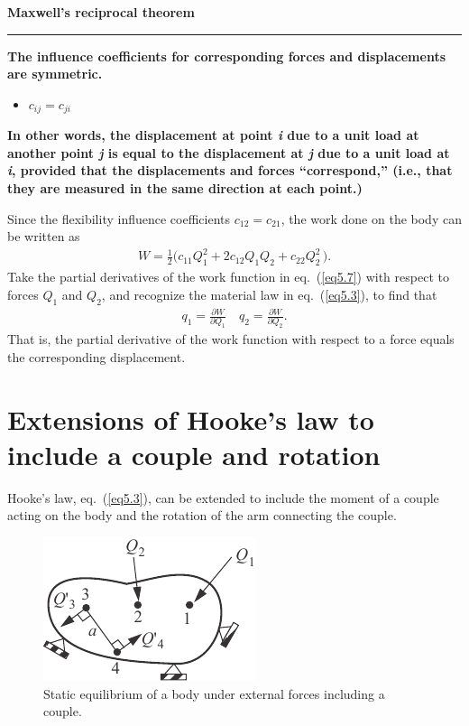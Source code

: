 \documentclass{AeroStructure-ERJohnson}
\begin{document}
\begin{framed}
\noindent\textbf{Maxwell's reciprocal theorem}\\
\hspace*{-10pt}\rule{37.45pc}{2pt}
\textbf{The influence coefficients for corresponding forces and displacements are symmetric.}\vspace*{-6pt}
\begin{itemize}
\item $c_{i j}=c_{j i}$\vspace*{-5pt}
\end{itemize}
\noindent\textbf{In other words, the displacement at point \textit{i} due to a unit load at another point \textit{j} is equal to the displacement at \textit{j} due to a unit load at \textit{i}, provided that the displacements and forces ``correspond,'' (i.e., that they are measured in the same direction at each point.)}
\end{framed}\vspace*{-6pt}

Since the flexibility influence coefficients $c_{12} = c_{21}$, the work done on the body can be written as
\begin{align}\label{eq5.7}
W=\frac{1}{2}\big(c_{11} Q_{1}^{2}+2 c_{12} Q_{1} Q_{2}+c_{22} Q_{2}^{2}\,\big).
\end{align}
Take the partial derivatives of the work function in eq.~(\ref{eq5.7}) with respect to forces $Q_1$ and $Q_2$, and recognize the material law in eq.~(\ref{eq5.3}), to find that
\begin{align}\label{eq5.8}
q_{1}=\frac{\partial W}{\partial Q_{1}} \quad q_{2}=\frac{\partial W}{\partial Q_{2}}.
\end{align}
That is, the partial derivative of the work function with respect to a force equals the corresponding displacement.

\section{Extensions of Hooke's law to include a couple and rotation}\label{sec5.2}

Hooke's law, eq.~(\ref{eq5.3}), can be extended to include the moment of a couple acting on the body and the rotation of the arm connecting the couple.

\begin{figure}
\vspace{-19pt}
\includegraphics{Figure_5-5.pdf}
\caption{Static equilibrium of a body under external forces including a couple. \label{fig5.5}}
\end{figure}
\end{document}
